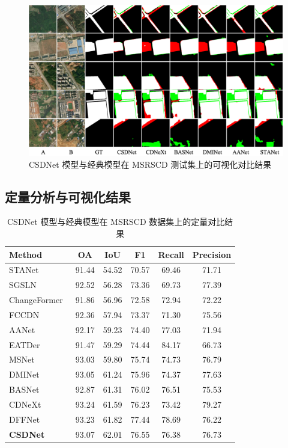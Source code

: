 \begin{figure}[!htb]
	\centering
	\includegraphics[width=\linewidth]{paper_figures/基于双时相遥感影像风格解缠和内容细化增强遥感变化检测方法/csdnet_msrscd.png}
    \caption{CSDNet 模型与经典模型在 MSRSCD 测试集上的可视化对比结果}
	\label{fig:csdnet_msrscd}
\end{figure}

\subsection{定量分析与可视化结果}

\begin{table}[!htb]
\centering
\caption{CSDNet 模型与经典模型在 MSRSCD 数据集上的定量对比结果}
\label{tab:csdnet_msrscd}
\begin{tabular}{l c c c c c}
\toprule
Method & OA & IoU & F1 & Recall & Precision \\
\midrule
STANet~\cite{chen_spatial-temporal_2020} & 91.44 & 54.52 & 70.57 & 69.46 & 71.71 \\
SGSLN~\cite{zhao_exchanging_2023} & 92.52 & 56.28 & 73.36 & 69.73 & 77.39 \\
ChangeFormer~\cite{bandara2022transformer} & 91.86 & 56.96 & 72.58 & 72.94 & 72.22 \\
FCCDN~\cite{Chen2021FCCDNFC} & 92.36 & 57.94 & 73.37 & 71.30 & 75.56 \\
AANet~\cite{Hang2024AANetAA} & 92.17 & 59.23 & 74.40 & 77.03 & 71.94 \\
EATDer~\cite{Ma2024EATDerEA} & 91.47 & 59.29 & 74.44 & 84.17 & 66.73 \\
MSNet~\cite{Liu2025NetworkAD} & 93.03 & 59.80 & 75.74 & 74.73 & 76.79 \\
DMINet~\cite{feng_change_2023} & 93.05 & 61.24 & 75.96 & 74.37 & 77.63 \\
BASNet~\cite{z_wang_bitemporal_2024} & 92.87 & 61.31 & 76.02 & 76.51 & 75.53 \\
CDNeXt~\cite{wei_robust_2024} & 93.24 & 61.59 & 76.23 & 73.42 & 79.27 \\
DFFNet~\cite{Liu2025FullScaleCD} & 93.23 & 61.82 & 77.44 & 78.69 & 76.22 \\
\textbf{CSDNet} & 93.07 & 62.01 & 76.55 & 76.38 & 76.73 \\
\bottomrule
\end{tabular}%
\end{table}

